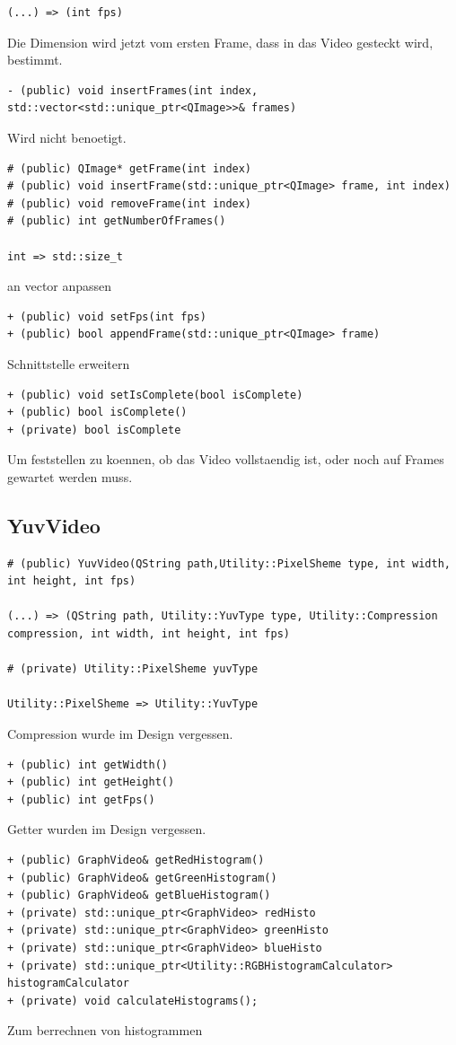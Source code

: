 \documentclass{scrartcl}
\begin{document}
{\begin{verbatim}
(...) => (int fps)
\end{verbatim}
Die Dimension wird jetzt vom ersten Frame, dass in das Video gesteckt wird, bestimmt.

\begin{verbatim}
- (public) void insertFrames(int index, std::vector<std::unique_ptr<QImage>>& frames)
\end{verbatim}
Wird nicht benoetigt.

\begin{verbatim}
# (public) QImage* getFrame(int index)
# (public) void insertFrame(std::unique_ptr<QImage> frame, int index)
# (public) void removeFrame(int index)
# (public) int getNumberOfFrames()

int => std::size_t
\end{verbatim}
an vector anpassen

\begin{verbatim}
+ (public) void setFps(int fps)
+ (public) bool appendFrame(std::unique_ptr<QImage> frame)
\end{verbatim}
Schnittstelle erweitern

\begin{verbatim}
+ (public) void setIsComplete(bool isComplete)
+ (public) bool isComplete()
+ (private) bool isComplete
\end{verbatim}
Um feststellen zu koennen, ob das Video vollstaendig ist, oder noch auf Frames gewartet werden muss.
\subsection{YuvVideo}
\begin{verbatim}
# (public) YuvVideo(QString path,Utility::PixelSheme type, int width, int height, int fps)

(...) => (QString path, Utility::YuvType type, Utility::Compression compression, int width, int height, int fps)

# (private) Utility::PixelSheme yuvType

Utility::PixelSheme => Utility::YuvType
\end{verbatim}
Compression wurde im Design vergessen.

\begin{verbatim}
+ (public) int getWidth()
+ (public) int getHeight()
+ (public) int getFps()
\end{verbatim}
Getter wurden im Design vergessen.

\begin{verbatim}
+ (public) GraphVideo& getRedHistogram()
+ (public) GraphVideo& getGreenHistogram()
+ (public) GraphVideo& getBlueHistogram()
+ (private) std::unique_ptr<GraphVideo> redHisto
+ (private) std::unique_ptr<GraphVideo> greenHisto
+ (private) std::unique_ptr<GraphVideo> blueHisto
+ (private) std::unique_ptr<Utility::RGBHistogramCalculator> histogramCalculator
+ (private) void calculateHistograms();
\end{verbatim}
Zum berrechnen von histogrammen

}
\end{document}
